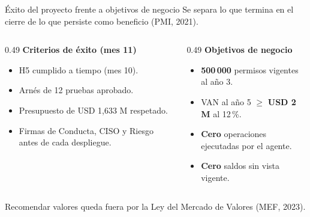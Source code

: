 \documentclass[aspectratio=169,11pt]{beamer}
\begin{document}
\begin{frame}{Éxito del proyecto frente a objetivos de negocio}
\vspace{0.1cm}
{\small Se separa lo que termina en el cierre de lo que persiste como beneficio (PMI, 2021).}
\vspace{0.3em}
\begin{columns}[T]
\begin{column}{0.49\textwidth}
{\color{cobre}\bfseries Criterios de éxito (mes 11)}
\begin{itemize}
\setlength{\itemsep}{0.2em}
  \item H5 cumplido a tiempo (mes 10).
  \item Arnés de 12 pruebas aprobado.
  \item Presupuesto de USD 1,633 M respetado.
  \item Firmas de Conducta, CISO y Riesgo antes de cada despliegue.
\end{itemize}
\end{column}
\begin{column}{0.49\textwidth}
{\color{bcp}\bfseries Objetivos de negocio}
\begin{itemize}
\setlength{\itemsep}{0.2em}
  \item \textbf{500\,000} permisos vigentes al año 3.
  \item VAN al año 5 $\geq$ \textbf{USD 2 M} al 12\,\%.
  \item \textbf{Cero} operaciones ejecutadas por el agente.
  \item \textbf{Cero} saldos sin vista vigente.
\end{itemize}
\end{column}
\end{columns}
\vspace{0.35cm}
{\small\color{muted} Recomendar valores queda fuera por la Ley del Mercado de Valores (MEF, 2023).}
\end{frame}
\end{document}
